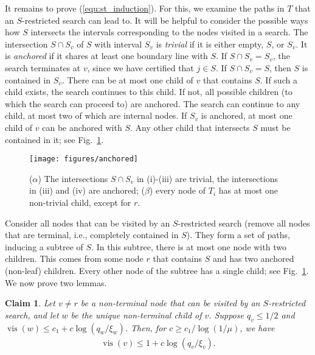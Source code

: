 \documentclass[letterpaper,11pt]{article}
\newtheorem{claim}[theorem]{Claim}
\DeclareMathOperator{\vis}{vis}
\begin{document}
It remains to prove 
(\ref{equ:st_induction}).
For this, we examine the 
paths in $T$ that an 
$S$-restricted search can lead to.
It will be helpful to consider 
the possible ways how $S$  
intersects the intervals 
corresponding to the nodes 
visited in a search. The 
intersection $S \cap S_v$ of 
$S$ with interval $S_v$ is 
\emph{trivial} if it is 
either empty, $S$, or $S_v$. 
It is \emph{anchored} if it 
shares at least one boundary 
line with $S$.  If 
$S \cap S_v = S_v$, the search 
terminates at $v$, since 
we have certified that $j \in S$. 
If $S \cap S_v = S$, 
then $S$ is contained in $S_v$.
There can be at most one child of 
$v$ that contains $S$. If such a 
child exists, the search continues 
to this child. If not, all 
possible children (to which the search can proceed to) 
are anchored. The search
can continue to any child, at most two 
of which are internal nodes.
If $S_v$ is anchored,  at most one child 
of $v$ can be anchored with $S$.
Any other child that intersects $S$ must 
be contained in it; see
Fig.~\ref{fig:anchored}.

\begin{figure}
\centering
\texttt{[image: figures/anchored]}
\caption{($\alpha$) The 
intersections $S \cap S_v$ in (i)-(iii) 
are trivial, the
intersections in (iii) and (iv) 
are anchored; ($\beta$) every 
node of $T_i$
has at most one non-trivial child, 
except for $r$.}
\label{fig:anchored}
\end{figure}


Consider all nodes that 
can be visited by an $S$-restricted 
search (remove all nodes that are 
terminal, i.e., completely 
contained in $S$).  They form a 
set of paths, inducing a subtree 
of $S$. In this subtree, there 
is at most one node with two children. 
This comes from some node $r$ 
that contains $S$ and has two 
anchored (non-leaf) children. Every 
other node of the subtree has a 
single child; see Fig.~\ref{fig:anchored}.
We now prove two lemmas.

\begin{claim}\label{clm:WA}
  Let $v \neq r$ be a 
  non-terminal node that 
  can be visited by 
  an $S$-restricted
  search, and let $w$ 
  be the unique non-terminal 
  child of $v$. Suppose $q_v \le 1/2$
  and $\vis(w) \le c_1 + c\log(q_w/\xi_w)$.
  Then, for $c\ge c_1/\log(1/\mu)$, we have
  \begin{align} \label{T_i recur}
   \vis(v) \le 1 + c\log(q_v/\xi_v).
  \end{align}
\end{claim}
\end{document}

